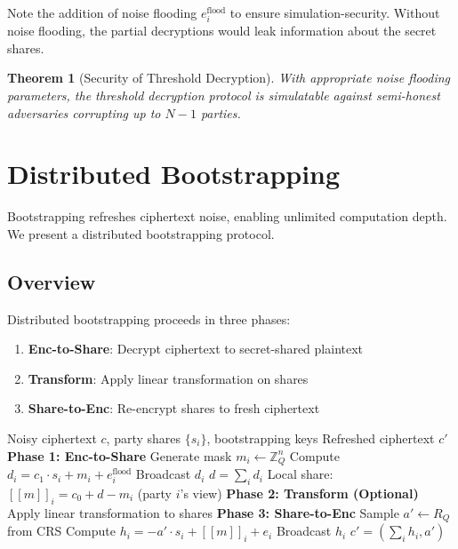 \documentclass[11pt,a4paper]{article}
\newtheorem{theorem}{Theorem}[section]
\begin{document}
Note the addition of noise flooding $e_i^{\text{flood}}$ to ensure simulation-security. Without noise flooding, the partial decryptions would leak information about the secret shares.

\begin{theorem}[Security of Threshold Decryption]
With appropriate noise flooding parameters, the threshold decryption protocol is simulatable against semi-honest adversaries corrupting up to $N-1$ parties.
\end{theorem}

\section{Distributed Bootstrapping}

Bootstrapping refreshes ciphertext noise, enabling unlimited computation depth. We present a distributed bootstrapping protocol.

\subsection{Overview}

Distributed bootstrapping proceeds in three phases:
\begin{enumerate}
    \item \textbf{Enc-to-Share}: Decrypt ciphertext to secret-shared plaintext
    \item \textbf{Transform}: Apply linear transformation on shares
    \item \textbf{Share-to-Enc}: Re-encrypt shares to fresh ciphertext
\end{enumerate}

\begin{algorithm}
\caption{Distributed Bootstrapping}
\begin{algorithmic}[1]
\Require Noisy ciphertext $c$, party shares $\{s_i\}$, bootstrapping keys
\Ensure Refreshed ciphertext $c'$
\State \textbf{Phase 1: Enc-to-Share}
    \State Generate mask $m_i \leftarrow \mathbb{Z}_Q^n$
    \State Compute $d_i = c_1 \cdot s_i + m_i + e_i^{\text{flood}}$
    \State Broadcast $d_i$
\EndFor
\State $d = \sum_i d_i$
\State Local share: $[\![m]\!]_i = c_0 + d - m_i$ (party $i$'s view)
\State \textbf{Phase 2: Transform (Optional)}
\State Apply linear transformation to shares
\State \textbf{Phase 3: Share-to-Enc}
    \State Sample $a' \leftarrow R_Q$ from CRS
    \State Compute $h_i = -a' \cdot s_i + [\![m]\!]_i + e_i$
    \State Broadcast $h_i$
\EndFor
\State $c' = (\sum_i h_i, a')$
\end{algorithmic}
\end{algorithm}
\end{document}

